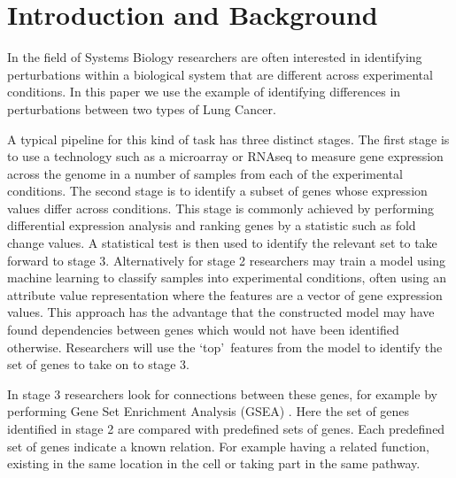 \documentclass[runningheads,a4paper]{llncs}
\begin{document}
\section{Introduction and Background}

In the field of Systems Biology researchers are often interested in identifying perturbations within a biological system that are different across experimental conditions. In this paper we use the example of identifying differences in perturbations between two types of Lung Cancer.

A typical pipeline for this kind of task has three distinct stages. The first stage is to use a technology such as a microarray or RNAseq to measure gene expression across the genome in a number of samples from each of the experimental conditions. 
The second stage is to identify a subset of genes whose expression values differ across conditions.
This stage is commonly achieved by performing differential expression analysis and ranking genes by a statistic such as fold change values. A statistical test is then used to identify the relevant set to take forward to stage 3. 
Alternatively for stage 2 researchers may train a model using machine learning to classify samples into experimental conditions, often using an attribute value representation where the features are a vector of gene expression values. 
This approach has the advantage that the constructed model may have found dependencies between genes which would not have been identified otherwise.
Researchers will use the \lq top\rq\ features from the model to identify the set of genes to take on to stage 3. 


In stage 3  researchers look for connections between these genes, for example by performing Gene Set Enrichment Analysis (GSEA) \citep{subramanian_gene_2005}. Here the set of genes identified in stage 2 are compared with predefined sets of genes. Each predefined set of genes indicate a known relation. For example having a related function, existing in the same location in the cell or taking part in the same pathway. 
\end{document}
